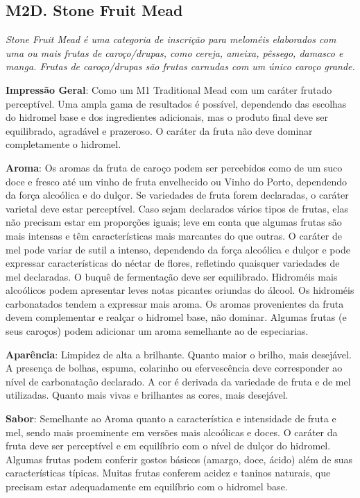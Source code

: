 \subsection*{M2D. Stone Fruit Mead}

\textit{Stone Fruit Mead é uma categoria de inscrição para meloméis elaborados com uma ou mais frutas de caroço/drupas, como cereja, ameixa, pêssego, damasco e manga. Frutas de caroço/drupas são frutas carnudas com um único caroço grande.}

\textbf{Impressão Geral}: Como um M1 Traditional Mead com um caráter frutado perceptível. Uma ampla gama de resultados é possível, dependendo das escolhas do hidromel base e dos ingredientes adicionais, mas o produto final deve ser equilibrado, agradável e prazeroso. O caráter da fruta não deve dominar completamente o hidromel.

\textbf{Aroma}: Os aromas da fruta de caroço podem ser percebidos como de um suco doce e fresco até um vinho de fruta envelhecido ou Vinho do Porto, dependendo da força alcoólica e do dulçor. Se variedades de fruta forem declaradas, o caráter varietal deve estar perceptível. Caso sejam declarados vários tipos de frutas, elas não precisam estar em proporções iguais; leve em conta que algumas frutas são mais intensas e têm características mais marcantes do que outras. O caráter de mel pode variar de sutil a intenso, dependendo da força alcoólica e dulçor e pode expressar características do néctar de flores, refletindo quaisquer variedades de mel declaradas. O buquê de fermentação deve ser equilibrado. Hidroméis mais alcoólicos podem apresentar leves notas picantes oriundas do álcool. Os hidroméis carbonatados tendem a expressar mais aroma. Os aromas provenientes da fruta devem complementar e realçar o hidromel base, não dominar. Algumas frutas (e seus caroços) podem adicionar um aroma semelhante ao de especiarias.

\textbf{Aparência}: Limpidez de alta a brilhante. Quanto maior o brilho, mais desejável. A presença de bolhas, espuma, colarinho ou efervescência deve corresponder ao nível de carbonatação declarado. A cor é derivada da variedade de fruta e de mel utilizadas. Quanto mais vivas e brilhantes as cores, mais desejável.

\textbf{Sabor}: Semelhante ao Aroma quanto a característica e intensidade de fruta e mel, sendo mais proeminente em versões mais alcoólicas e doces. O caráter da fruta deve ser perceptível e em equilíbrio com o nível de dulçor do hidromel. Algumas frutas podem conferir gostos básicos (amargo, doce, ácido) além de suas características típicas. Muitas frutas conferem acidez e taninos naturais, que precisam estar adequadamente em equilíbrio com o hidromel base.

